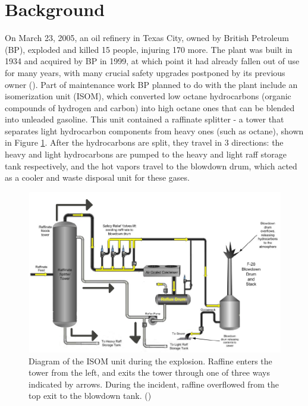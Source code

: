 \documentclass[12pt]{article}
\begin{document}
	\section*{Background}
	
	On March 23, 2005, an oil refinery in Texas City, owned by British Petroleum (BP), exploded and killed 15 people, injuring 170 more. The plant was built in 1934 and acquired by BP in 1999, at which point it had already fallen out of use for many years, with many crucial safety upgrades postponed by its previous owner (\cite{frontline_2010}). Part of maintenance work BP planned to do with the plant include an isomerization unit (ISOM), which converted low octane hydrocarbons (organic compounds of hydrogen and carbon) into high octane ones that can be blended into unleaded gasoline. This unit contained a raffinate splitter - a tower that separates light hydrocarbon components from heavy ones (such as octane), shown in Figure \ref{fig:ISOMUnit}. After the hydrocarbons are split, they travel in 3 directions: the heavy and light hydrocarbons are pumped to the heavy and light raff storage tank respectively, and the hot vapors travel to the blowdown drum, which acted as a cooler and waste disposal unit for these gases.
		
	\begin{figure}[H]
		
		\includegraphics[width=\textwidth]{BP_Texas_City_incident_diagram.png}
		\caption{Diagram of the ISOM unit during the explosion. Raffine enters the tower from the left, and exits the tower through one of three ways indicated by arrows. During the incident, raffine overflowed from the top exit to the blowdown tank. (\cite{BPreport})}
		\label{fig:ISOMUnit}
	\end{figure}
\end{document}
